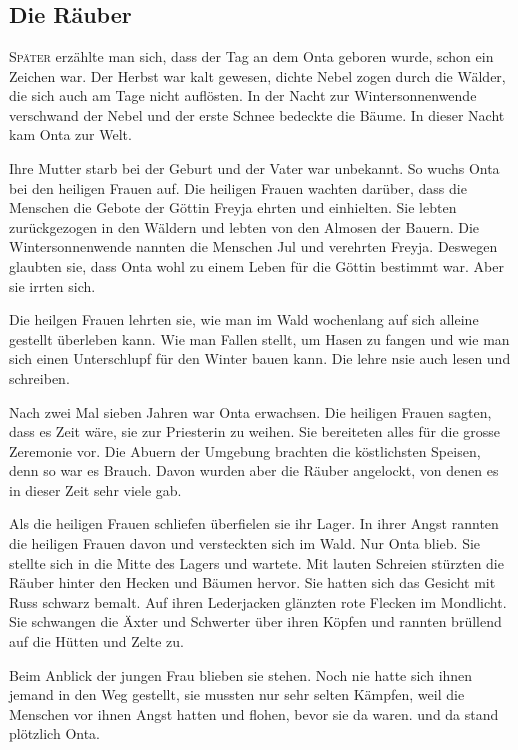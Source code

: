 \chapter*{}
\section*{Die Räuber}
\lettrine[lines=3]{\color{red}S}{päter} erzählte man sich, dass der Tag an dem Onta geboren wurde, schon ein Zeichen war. Der Herbst war kalt gewesen, dichte Nebel zogen durch die Wälder, die sich auch am Tage nicht auflösten. In der Nacht zur Wintersonnenwende verschwand der Nebel und der erste Schnee bedeckte die Bäume. In dieser Nacht kam Onta zur Welt.

Ihre Mutter starb bei der Geburt und der Vater war unbekannt. So wuchs Onta bei den heiligen Frauen auf. Die heiligen Frauen wachten darüber, dass die Menschen die Gebote der Göttin Freyja ehrten und einhielten. Sie lebten zurückgezogen in den Wäldern und lebten von den Almosen der Bauern. Die Wintersonnenwende nannten die Menschen Jul und verehrten Freyja. Deswegen glaubten sie, dass Onta wohl zu einem Leben für die Göttin bestimmt war. Aber sie irrten sich.

Die heilgen Frauen lehrten sie, wie man im Wald wochenlang auf sich alleine gestellt überleben kann. Wie man Fallen stellt, um Hasen zu fangen und wie man sich einen Unterschlupf für den Winter bauen kann. Die lehre nsie auch lesen und schreiben.

Nach zwei Mal sieben Jahren war Onta erwachsen. Die heiligen Frauen sagten, dass es Zeit wäre, sie zur Priesterin zu weihen. Sie bereiteten alles für die grosse Zeremonie vor. Die Abuern der Umgebung brachten die köstlichsten Speisen, denn so war es Brauch. Davon wurden aber die Räuber angelockt, von denen es in dieser Zeit sehr viele gab.

Als die heiligen Frauen schliefen überfielen sie ihr Lager. In ihrer Angst rannten die heiligen Frauen davon und versteckten sich im Wald. Nur Onta blieb. Sie stellte sich in die Mitte des Lagers und wartete. Mit lauten Schreien stürzten die Räuber hinter den Hecken und Bäumen hervor. Sie hatten sich das Gesicht mit Russ schwarz bemalt. Auf ihren Lederjacken glänzten rote Flecken im Mondlicht. Sie schwangen die Äxter und Schwerter über ihren Köpfen und rannten brüllend auf die Hütten und Zelte zu.

Beim Anblick der jungen Frau blieben sie stehen. Noch nie hatte sich ihnen jemand in den Weg gestellt, sie mussten nur sehr selten Kämpfen, weil die Menschen vor ihnen Angst hatten und flohen, bevor sie da waren. und da stand plötzlich Onta.

